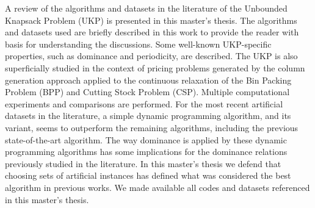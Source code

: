 A review of the algorithms and datasets in the literature of the Unbounded Knapsack Problem (UKP) is presented in this master's thesis.
The algorithms and datasets used are briefly described in this work to provide the reader with basis for understanding the discussions.
Some well-known UKP-specific properties, such as dominance and periodicity, are described.
The UKP is also superficially studied in the context of pricing problems generated by the column generation approach applied to the continuous relaxation of the Bin Packing Problem (BPP) and Cutting Stock Problem (CSP).
Multiple computational experiments and comparisons are performed.
For the most recent artificial datasets in the literature, a simple dynamic programming algorithm, and its variant, seems to outperform the remaining algorithms, including the previous state-of-the-art algorithm.
The way dominance is applied by these dynamic programming algorithms has some implications for the dominance relations previously studied in the literature.
In this master's thesis we defend that choosing sets of artificial instances has defined what was considered the best algorithm in previous works.
We made available all codes and datasets referenced in this master's thesis.

